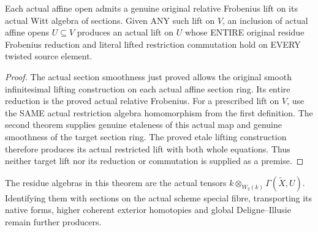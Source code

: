 \begin{theorem}
\label{thm:witt-two-scheme-affine-restriction-lift-exists}
\leanok
Each actual affine open admits a genuine original relative
Frobenius lift on its actual Witt algebra of sections. Given ANY
such lift on $V$, an inclusion of actual affine opens
$U\subseteq V$ produces an actual lift on $U$ whose ENTIRE
original residue Frobenius reduction and literal lifted
restriction commutation hold on EVERY twisted source element.
\end{theorem}
\begin{proof}
The actual section smoothness just proved allows the original
smooth infinitesimal lifting construction on each actual affine
section ring. Its entire reduction is the proved actual relative
Frobenius. For a prescribed lift on $V$, use the SAME actual
restriction algebra homomorphism from the first definition.
The second theorem supplies genuine etaleness of this actual
map and genuine smoothness of the target section ring. The
proved etale lifting construction therefore produces its actual
restricted lift with both whole equations. Thus neither target
lift nor its reduction or commutation is supplied as a premise.
\end{proof}

The residue algebras in this theorem are the actual tensors
$k\otimes_{W_2(k)}\Gamma(\widetilde X,U)$. Identifying them with
sections on the actual scheme special fibre, transporting its
native forms, higher coherent exterior homotopies and global
Deligne--Illusie remain further producers.

